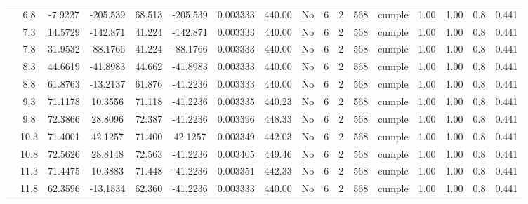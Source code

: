 \begin{table}[H]
{\begin{tabular}{|c|c|c|c|c|c|c|c|c|c|c|c|c|c|c|c|c|}
\cline{2-17}        & \cellcolor[rgb]{ .851,  .882,  .949}6.8 & -7.9227 & -205.539 & 68.513 & -205.539 & 0.003333 & 440.00 & No  & 6   & 2   & 568 & \cellcolor[rgb]{ .776,  .937,  .808}cumple & 1.00 & 1.00 & 0.8 & 0.441 \bigstrut\\
\cline{2-17}        & 7.3 & 14.5729 & -142.871 & 41.224 & -142.871 & 0.003333 & 440.00 & No  & 6   & 2   & 568 & \cellcolor[rgb]{ .776,  .937,  .808}cumple & 1.00 & 1.00 & 0.8 & 0.441 \bigstrut\\
\cline{2-17}        & 7.8 & 31.9532 & -88.1766 & 41.224 & -88.1766 & 0.003333 & 440.00 & No  & 6   & 2   & 568 & \cellcolor[rgb]{ .776,  .937,  .808}cumple & 1.00 & 1.00 & 0.8 & 0.441 \bigstrut\\
\cline{2-17}        & 8.3 & 44.6619 & -41.8983 & 44.662 & -41.8983 & 0.003333 & 440.00 & No  & 6   & 2   & 568 & \cellcolor[rgb]{ .776,  .937,  .808}cumple & 1.00 & 1.00 & 0.8 & 0.441 \bigstrut\\
\cline{2-17}        & 8.8 & 61.8763 & -13.2137 & 61.876 & -41.2236 & 0.003333 & 440.00 & No  & 6   & 2   & 568 & \cellcolor[rgb]{ .776,  .937,  .808}cumple & 1.00 & 1.00 & 0.8 & 0.441 \bigstrut\\
\cline{2-17}        & 9.3 & 71.1178 & 10.3556 & 71.118 & -41.2236 & 0.003335 & 440.23 & No  & 6   & 2   & 568 & \cellcolor[rgb]{ .776,  .937,  .808}cumple & 1.00 & 1.00 & 0.8 & 0.441 \bigstrut\\
\cline{2-17}        & 9.8 & 72.3866 & 28.8096 & 72.387 & -41.2236 & 0.003396 & 448.33 & No  & 6   & 2   & 568 & \cellcolor[rgb]{ .776,  .937,  .808}cumple & 1.00 & 1.00 & 0.8 & 0.441 \bigstrut\\
\cline{2-17}        & 10.3 & 71.4001 & 42.1257 & 71.400 & 42.1257 & 0.003349 & 442.03 & No  & 6   & 2   & 568 & \cellcolor[rgb]{ .776,  .937,  .808}cumple & 1.00 & 1.00 & 0.8 & 0.441 \bigstrut\\
\cline{2-17}        & 10.8 & 72.5626 & 28.8148 & 72.563 & -41.2236 & 0.003405 & 449.46 & No  & 6   & 2   & 568 & \cellcolor[rgb]{ .776,  .937,  .808}cumple & 1.00 & 1.00 & 0.8 & 0.441 \bigstrut\\
\cline{2-17}        & 11.3 & 71.4475 & 10.3883 & 71.448 & -41.2236 & 0.003351 & 442.33 & No  & 6   & 2   & 568 & \cellcolor[rgb]{ .776,  .937,  .808}cumple & 1.00 & 1.00 & 0.8 & 0.441 \bigstrut\\
\cline{2-17}        & 11.8 & 62.3596 & -13.1534 & 62.360 & -41.2236 & 0.003333 & 440.00 & No  & 6   & 2   & 568 & \cellcolor[rgb]{ .776,  .937,  .808}cumple & 1.00 & 1.00 & 0.8 & 0.441 \bigstrut\\

\end{tabular}}
\end{table}
